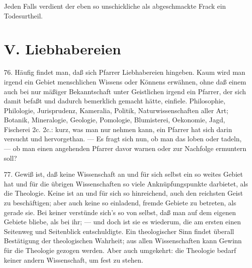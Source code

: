 Jeden Falls verdient der eben so unschickliche als abgeschmackte Frack ein Todesurtheil.

\section{V. Liebhabereien}

76. Häufig findet man, daß sich Pfarrer Liebhabereien hingeben. Kaum wird man irgend ein Gebiet menschlichen Wissens oder Könnens erwähnen, ohne daß einem auch bei nur mäßiger Bekanntschaft unter Geistlichen irgend ein Pfarrer, der sich damit befaßt und dadurch bemerklich
gemacht hätte, einfiele. Philosophie, Philologie, Jurisprudenz, Kameralia, Politik, Naturwissenschaften aller Art; Botanik, Mineralogie, Geologie, Pomologie, Blumisterei, Oekonomie, Jagd, Fischerei 2c. 2c.: kurz, was man nur nehmen kann, ein Pfarrer hat sich darin versucht und hervorgethan. — Es fragt sich nun, ob man das loben oder tadeln, — ob man einen angehenden Pfarrer davor warnen oder zur Nachfolge ermuntern soll?

77. Gewiß ist, daß keine Wissenschaft an und für sich selbst ein so weites Gebiet hat und für die übrigen Wissenschaften so viele Anknüpfungspunkte darbietet, als die Theologie. Keine ist an und für sich so hinreichend, auch den reichsten Geist zu beschäftigen; aber auch keine so einladend, fremde Gebiete zu betreten, als gerade sie. Bei keiner verstünde sich’s so von selbst, daß man auf dem eigenen Gebiete bliebe, als bei ihr; — und doch ist sie es wiederum, die am ersten einen Seitenweg und Seitenblick entschuldigte. Ein theologischer Sinn findet überall Bestätigung der theologischen Wahrheit; aus allen Wissenschaften kann Gewinn für die Theologie gezogen werden. Aber auch umgekehrt: die Theologie bedarf keiner andern Wissenschaft, um fest zu stehen.

